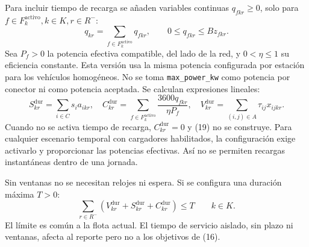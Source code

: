 \documentclass[11pt,a4paper]{article}
\newcommand{\Rminus}{R^{-}}
\newcommand{\code}[1]{\texttt{\small #1}}
\begin{document}
Para incluir tiempo de recarga se añaden variables continuas $q_{fkr}\ge0$,
solo para $f\in F_k^{\mathrm{activo}}, k\in K,r\in\Rminus$:
\begin{equation}
q_{kr}=\sum_{f\in F_k^{\mathrm{activo}}}q_{fkr},\qquad
0\le q_{fkr}\le Bz_{fkr}. \tag{19}
\end{equation}
Sea $P_f>0$ la potencia efectiva compatible, del lado de la red, y
$0<\eta\le1$ su eficiencia constante. Esta versión usa la misma potencia
configurada por estación para los vehículos homogéneos. No se toma
\code{max\_power\_kw} como potencia por conector ni como potencia aceptada.
Se calculan expresiones lineales:
\begin{equation}
S_{kr}^{\mathrm{dur}}=\sum_{i\in C}s_i a_{ikr},\quad
C_{kr}^{\mathrm{dur}}=\sum_{f\in F_k^{\mathrm{activo}}}
\frac{3600q_{fkr}}{\eta P_f},\quad
V_{kr}^{\mathrm{dur}}=\sum_{(i,j)\in A}\tau_{ij}x_{ijkr}. \tag{20}
\end{equation}
Cuando no se activa tiempo de recarga, $C_{kr}^{\mathrm{dur}}=0$ y (19) no
se construye. Para cualquier escenario temporal con cargadores habilitados,
la configuración exige activarlo y proporcionar las potencias efectivas.
Así no se permiten recargas instantáneas dentro de una jornada.

Sin ventanas no se necesitan relojes ni espera. Si se configura una duración
máxima $T>0$:
\begin{equation}
\sum_{r\in\Rminus}
\left(V_{kr}^{\mathrm{dur}}+S_{kr}^{\mathrm{dur}}+C_{kr}^{\mathrm{dur}}\right)
\le T \qquad k\in K. \tag{21}
\end{equation}
El límite es común a la flota actual. El tiempo de servicio aislado, sin
plazo ni ventanas, afecta al reporte pero no a los objetivos de (16).
\end{document}
